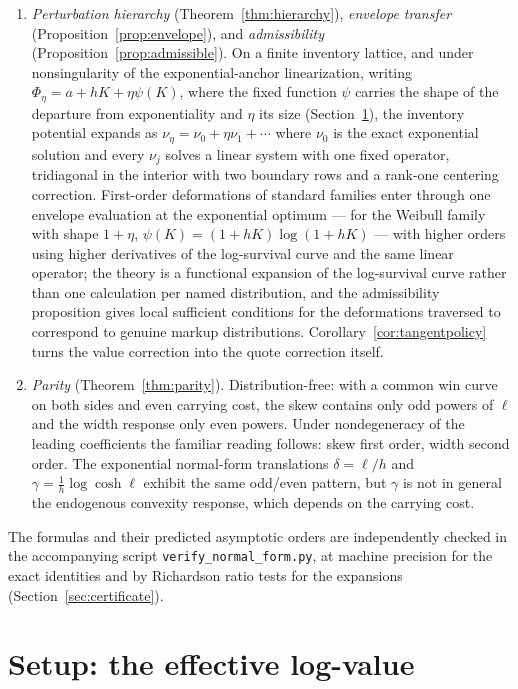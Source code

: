\documentclass[11pt]{article}
\begin{document}
\begin{enumerate}
\item \emph{Perturbation hierarchy} (Theorem~\ref{thm:hierarchy}), \emph{envelope transfer} (Proposition~\ref{prop:envelope}), and \emph{admissibility} (Proposition~\ref{prop:admissible}). On a finite inventory lattice, and under nonsingularity of the exponential-anchor linearization, writing $\Phi_\eta = a + hK + \eta\psi(K)$, where the fixed function $\psi$ carries the shape of the departure from exponentiality and $\eta$ its size (Section~\ref{sec:setup}), the inventory potential expands as $\nu_\eta = \nu_0 + \eta\nu_1 + \cdots$ where $\nu_0$ is the exact exponential solution and every $\nu_j$ solves a linear system with one fixed operator, tridiagonal in the interior with two boundary rows and a rank-one centering correction. First-order deformations of standard families enter through one envelope evaluation at the exponential optimum --- for the Weibull family with shape $1+\eta$, $\psi(K) = (1+hK)\log(1+hK)$ --- with higher orders using higher derivatives of the log-survival curve and the same linear operator; the theory is a functional expansion of the log-survival curve rather than one calculation per named distribution, and the admissibility proposition gives local sufficient conditions for the deformations traversed to correspond to genuine markup distributions. Corollary~\ref{cor:tangentpolicy} turns the value correction into the quote correction itself.
\item \emph{Parity} (Theorem~\ref{thm:parity}). Distribution-free: with a common win curve on both sides and even carrying cost, the skew contains only odd powers of $\ell$ and the width response only even powers. Under nondegeneracy of the leading coefficients the familiar reading follows: skew first order, width second order. The exponential normal-form translations $\delta = \ell/h$ and $\gamma = \tfrac1h\log\cosh\ell$ exhibit the same odd/even pattern, but $\gamma$ is not in general the endogenous convexity response, which depends on the carrying cost.
\end{enumerate}

The formulas and their predicted asymptotic orders are independently checked in the accompanying script \texttt{verify\_normal\_form.py}, at machine precision for the exact identities and by Richardson ratio tests for the expansions (Section~\ref{sec:certificate}).

\section{Setup: the effective log-value}\label{sec:setup}
\end{document}
